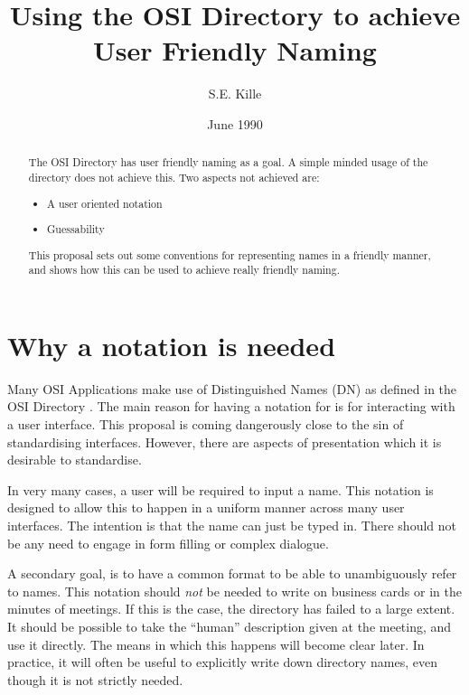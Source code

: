 \author {S.E. Kille}
\date {June 1990}
\title {Using the OSI Directory to achieve \\  User Friendly Naming}

\maketitle
\begin {abstract}
The OSI Directory has user friendly naming as a goal.  A simple minded usage
of the directory does not achieve this.  Two aspects not achieved are:

\begin{itemize}
\item A user oriented notation
\item Guessability
\end{itemize}

This proposal sets out some conventions for representing names in a friendly
manner, and shows how this can be used to achieve really friendly naming.
\end {abstract}

\tableofcontents
\listoffigures
\listoftables
\pagebreak

\section {Why a notation is needed}

Many OSI Applications make use of Distinguished Names (DN) as defined in the
OSI Directory \cite{CCITT.Directory}.
The main reason for having a notation for
is for interacting with a user
interface.  This proposal is coming dangerously close to the sin of
standardising interfaces.  However, there are aspects of presentation which
it is desirable to standardise.

In very many cases, a user will be required to
input a name.  This notation is designed to allow this to happen in a
uniform manner across many user interfaces.    The intention is that
the name can just be typed in.  There should not be any need to engage in
form filling or complex dialogue.

A secondary goal, is to have a common
format to be able to unambiguously refer to names.
This notation should {\em not} be needed to write on business cards or in
the minutes of meetings.  If this is the case, the directory has failed to a
large extent.  It should be possible to take the ``human'' description given
at the meeting, and use it directly.  The means in which this happens will
become clear later.  In practice, it will often be useful to explicitly write
down directory names, even though it is not strictly needed.

